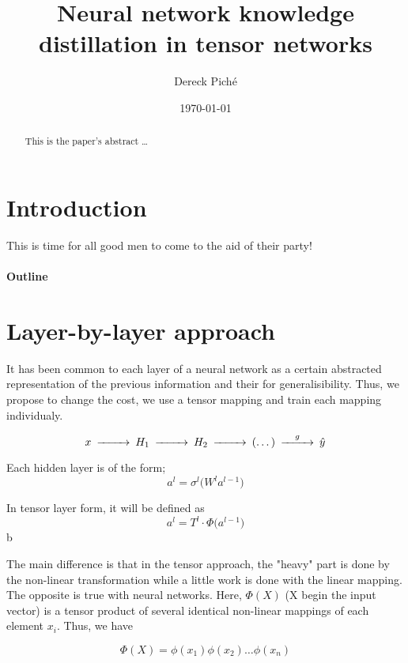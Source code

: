 \documentclass[11pt]{article}
\title{Neural network knowledge distillation in tensor networks}
\author{Dereck Piché}
\date{\today}
\begin{document}
\maketitle

\begin{abstract}
This is the paper's abstract \ldots
\end{abstract}

\section{Introduction}
This is time for all good men to come to the aid of their party!

\paragraph{Outline}


\section{Layer-by-layer approach}
It has been common to each layer of a neural network as a certain abstracted representation of the previous information and their for generalisibility. Thus, we propose to change the cost, we use a tensor mapping and train each mapping individualy.

\begin{equation*}
\begin{CD}
    x @>>>H_1 @>>>H_2 @>>>(\dots)@>g>> \hat{y}
\end{CD}
\end{equation*}

Each hidden layer is of the form;
\begin{equation*}
    a^l = \sigma^l \bigl( W^l a^{l-1} \bigr)
\end{equation*}

In tensor layer form, it will be defined as 
\begin{equation*}
    a^l = T^l \cdot \Phi \bigl( a^{l-1} \bigr)
\end{equation*}b

The main difference is that in the tensor approach, the "heavy" part is done by the non-linear transformation while a little work is done with the linear mapping. The opposite is true with neural networks. Here, $\Phi(X)$ (X begin the input vector) is a tensor product of several identical non-linear mappings of each element $x_i$. Thus, we have 

\begin{equation*}
    \Phi(X) = \phi(x_1)\phi(x_2)\dots\phi(x_n)
\end{equation*}
\end{document}
